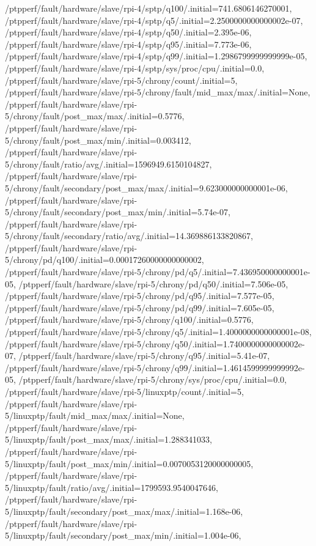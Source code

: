 {    /ptpperf/fault/hardware/slave/rpi-4/sptp/q100/.initial=741.6806146270001,
    /ptpperf/fault/hardware/slave/rpi-4/sptp/q5/.initial=2.2500000000000002e-07,
    /ptpperf/fault/hardware/slave/rpi-4/sptp/q50/.initial=2.395e-06,
    /ptpperf/fault/hardware/slave/rpi-4/sptp/q95/.initial=7.773e-06,
    /ptpperf/fault/hardware/slave/rpi-4/sptp/q99/.initial=1.2986799999999999e-05,
    /ptpperf/fault/hardware/slave/rpi-4/sptp/sys/proc/cpu/.initial=0.0,
    /ptpperf/fault/hardware/slave/rpi-5/chrony/count/.initial=5,
    /ptpperf/fault/hardware/slave/rpi-5/chrony/fault/mid_max/max/.initial=None,
    /ptpperf/fault/hardware/slave/rpi-5/chrony/fault/post_max/max/.initial=0.5776,
    /ptpperf/fault/hardware/slave/rpi-5/chrony/fault/post_max/min/.initial=0.003412,
    /ptpperf/fault/hardware/slave/rpi-5/chrony/fault/ratio/avg/.initial=1596949.6150104827,
    /ptpperf/fault/hardware/slave/rpi-5/chrony/fault/secondary/post_max/max/.initial=9.623000000000001e-06,
    /ptpperf/fault/hardware/slave/rpi-5/chrony/fault/secondary/post_max/min/.initial=5.74e-07,
    /ptpperf/fault/hardware/slave/rpi-5/chrony/fault/secondary/ratio/avg/.initial=14.369886133820867,
    /ptpperf/fault/hardware/slave/rpi-5/chrony/pd/q100/.initial=0.00017260000000000002,
    /ptpperf/fault/hardware/slave/rpi-5/chrony/pd/q5/.initial=7.436950000000001e-05,
    /ptpperf/fault/hardware/slave/rpi-5/chrony/pd/q50/.initial=7.506e-05,
    /ptpperf/fault/hardware/slave/rpi-5/chrony/pd/q95/.initial=7.577e-05,
    /ptpperf/fault/hardware/slave/rpi-5/chrony/pd/q99/.initial=7.605e-05,
    /ptpperf/fault/hardware/slave/rpi-5/chrony/q100/.initial=0.5776,
    /ptpperf/fault/hardware/slave/rpi-5/chrony/q5/.initial=1.4000000000000001e-08,
    /ptpperf/fault/hardware/slave/rpi-5/chrony/q50/.initial=1.7400000000000002e-07,
    /ptpperf/fault/hardware/slave/rpi-5/chrony/q95/.initial=5.41e-07,
    /ptpperf/fault/hardware/slave/rpi-5/chrony/q99/.initial=1.4614599999999992e-05,
    /ptpperf/fault/hardware/slave/rpi-5/chrony/sys/proc/cpu/.initial=0.0,
    /ptpperf/fault/hardware/slave/rpi-5/linuxptp/count/.initial=5,
    /ptpperf/fault/hardware/slave/rpi-5/linuxptp/fault/mid_max/max/.initial=None,
    /ptpperf/fault/hardware/slave/rpi-5/linuxptp/fault/post_max/max/.initial=1.288341033,
    /ptpperf/fault/hardware/slave/rpi-5/linuxptp/fault/post_max/min/.initial=0.0070053120000000005,
    /ptpperf/fault/hardware/slave/rpi-5/linuxptp/fault/ratio/avg/.initial=1799593.9540047646,
    /ptpperf/fault/hardware/slave/rpi-5/linuxptp/fault/secondary/post_max/max/.initial=1.168e-06,
    /ptpperf/fault/hardware/slave/rpi-5/linuxptp/fault/secondary/post_max/min/.initial=1.004e-06,
}
